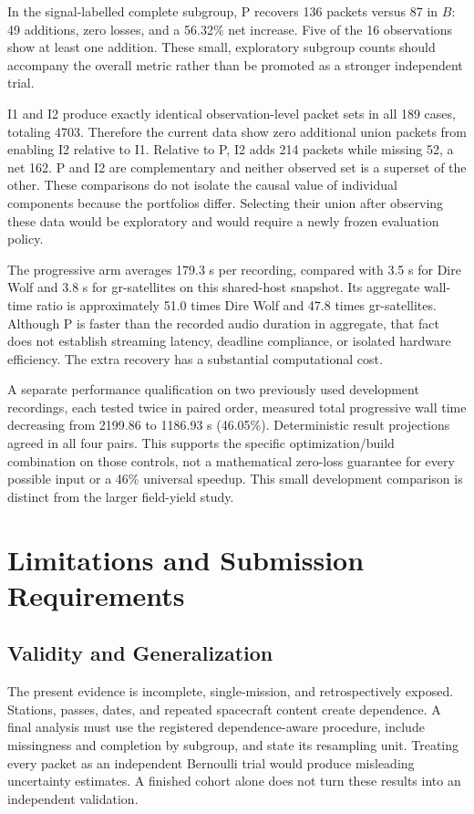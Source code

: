 \documentclass{ieeeaccess}
\begin{document}
In the signal-labelled complete subgroup, P recovers 136 packets versus 87 in $B$: 49 additions, zero losses, and a 56.32\% net increase. Five of the 16 observations show at least one addition. These small, exploratory subgroup counts should accompany the overall metric rather than be promoted as a stronger independent trial.

I1 and I2 produce exactly identical observation-level packet sets in all 189 cases, totaling 4703. Therefore the current data show zero additional union packets from enabling I2 relative to I1. Relative to P, I2 adds 214 packets while missing 52, a net 162. P and I2 are complementary and neither observed set is a superset of the other. These comparisons do not isolate the causal value of individual components because the portfolios differ. Selecting their union after observing these data would be exploratory and would require a newly frozen evaluation policy.

The progressive arm averages 179.3 s per recording, compared with 3.5 s for Dire Wolf and 3.8 s for gr-satellites on this shared-host snapshot. Its aggregate wall-time ratio is approximately 51.0 times Dire Wolf and 47.8 times gr-satellites. Although P is faster than the recorded audio duration in aggregate, that fact does not establish streaming latency, deadline compliance, or isolated hardware efficiency. The extra recovery has a substantial computational cost.

A separate performance qualification on two previously used development recordings, each tested twice in paired order, measured total progressive wall time decreasing from 2199.86 to 1186.93 s (46.05\%). Deterministic result projections agreed in all four pairs. This supports the specific optimization/build combination on those controls, not a mathematical zero-loss guarantee for every possible input or a 46\% universal speedup. This small development comparison is distinct from the larger field-yield study.

\section{Limitations and Submission Requirements}
\subsection{Validity and Generalization}
The present evidence is incomplete, single-mission, and retrospectively exposed. Stations, passes, dates, and repeated spacecraft content create dependence. A final analysis must use the registered dependence-aware procedure, include missingness and completion by subgroup, and state its resampling unit. Treating every packet as an independent Bernoulli trial would produce misleading uncertainty estimates. A finished cohort alone does not turn these results into an independent validation.
\end{document}
